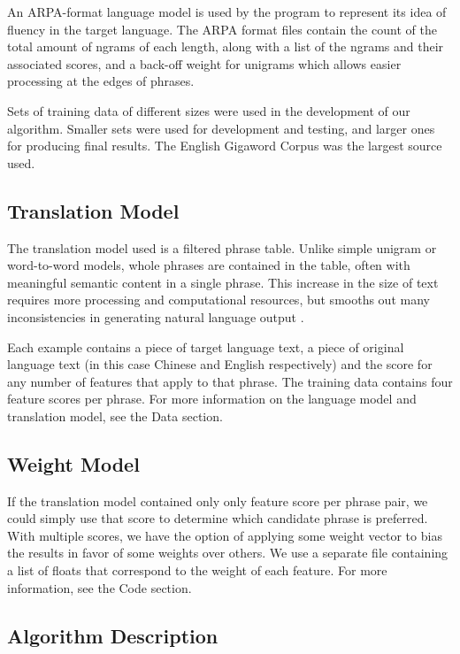 \documentclass[11pt,letterpaper]{article}
\begin{document}
An ARPA-format language model is used by the program to represent its idea of fluency in the target language. The ARPA format files contain the count of the total amount of ngrams of each length, along with a list of the ngrams and their associated scores, and a back-off weight for unigrams which allows easier processing at the edges of phrases. \cite{Katz}

Sets of training data of different sizes were used in the development of our algorithm. Smaller sets were used for development and testing, and larger ones for producing final results. The English Gigaword Corpus was the largest source used.

\subsection{Translation Model}

The translation model used is a filtered phrase table. Unlike simple unigram or word-to-word models, whole phrases are contained in the table, often with meaningful semantic content in a single phrase. This increase in the size of text requires more processing and computational resources, but smooths out many inconsistencies in generating natural language output \cite{Mac}.

 Each example contains a piece of target language text, a piece of original language text (in this case Chinese and English respectively) and the score for any number of features that apply to that phrase. The training data contains four feature scores per phrase. For more information on the language model and translation model, see the Data section.

\subsection{Weight Model}

If the translation model contained only only feature score per phrase pair, we could simply use that score to determine which candidate phrase is preferred. With multiple scores, we have the option of applying some weight vector to bias the results in favor of some weights over others. We use a separate file containing a list of floats that correspond to the weight of each feature. For more information, see the Code section.

\subsection{Algorithm Description}
\end{document}
